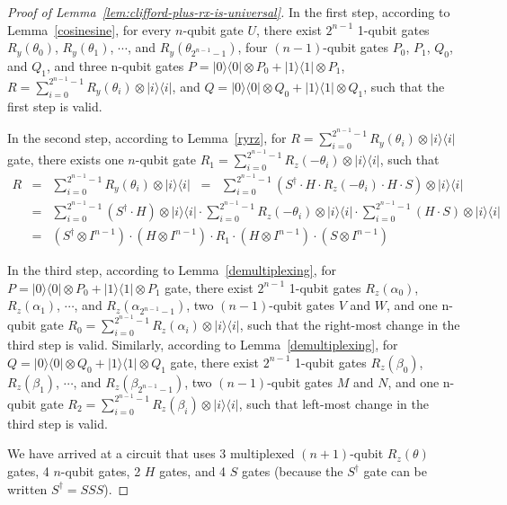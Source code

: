 \documentclass[11pt]{article}
\def\ket#1{|#1\rangle}
\def\bra#1{\langle#1|}
\def\outer#1#2{\ket{#1}\bra{#2}}
\begin{document}
\begin{proof}[Proof of Lemma~\ref{lem:clifford-plus-rx-is-universal}]
In the first step, according to Lemma~\ref{cosinesine}, for every $n$-qubit gate $U$, there exist $2^{n-1}$ 1-qubit gates $R_y(\theta_0)$, $R_y(\theta_1)$, $\cdots$, and $R_y(\theta_{2^{n-1}-1})$, four $(n-1)$-qubit gates $P_0$, $P_1$, $Q_0$, and $Q_1$, and three n-qubit gates $P = \outer{0}{0} \otimes P_{0} + \outer{1}{1} \otimes P_{1}$, $R = \sum^{2^{n-1}-1}_{i=0}R_y(\theta_i) \otimes \outer{i}{i}$, and $Q= \outer{0}{0} \otimes Q_{0} + \outer{1}{1} \otimes Q_{1}$, 
such that the first step is valid. 

In the second step, according to Lemma~\ref{ryrz}, for $R = \sum^{2^{n-1}-1}_{i=0}R_y(\theta_i) \otimes \outer{i}{i}$ gate, there exists one $n$-qubit gate $R_1 = \sum^{2^{n-1}-1}_{i=0}R_z(-\theta_i) \otimes \outer{i}{i}$, such that 
\begin{eqnarray*}
R & = & \sum^{2^{n-1}-1}_{i=0}R_y(\theta_i) \otimes \outer{i}{i} 
\;\;=\;\;
\sum^{2^{n-1}-1}_{i=0} ( S^\dag \cdot H \cdot R_z(-\theta_i) \cdot H \cdot S )\otimes \outer{i}{i} \\
& = & \sum^{2^{n-1}-1}_{i=0} ( S^\dag \cdot H )\otimes \outer{i}{i} \cdot  \sum^{2^{n-1}-1}_{i=0}   R_z(-\theta_i) \otimes \outer{i}{i}  \cdot \sum^{2^{n-1}-1}_{i=0} ( H \cdot S )\otimes \outer{i}{i} \\
& = & (S^\dag \otimes I^{n-1}) \cdot (H \otimes I^{n-1}) \cdot R_1 \cdot (H \otimes I^{n-1}) \cdot (S \otimes I^{n-1})
\end{eqnarray*}

In the third step, according to Lemma~\ref{demultiplexing}, for $P = \outer{0}{0} \otimes P_{0} + \outer{1}{1} \otimes P_{1} $ gate, there exist $2^{n-1}$ 1-qubit gates $R_z(\alpha_0)$, $R_z(\alpha_1)$, $\cdots$, and $R_z(\alpha_{2^{n-1}-1})$, two $(n-1)$-qubit gates $V$ and $W$, and one n-qubit gate $R_0 = \sum^{2^{n-1}-1}_{i=0}R_{z}(\alpha_i) \otimes \outer{i}{i}$, such that the right-most 
change in the third step is valid. 
Similarly, according to Lemma~\ref{demultiplexing}, for $Q = \outer{0}{0} \otimes Q_{0} + \outer{1}{1} \otimes Q_{1} $ gate, there exist $2^{n-1}$ 1-qubit gates $R_z(\beta_0)$, $R_z(\beta_1)$, $\cdots$, and $R_z(\beta_{2^{n-1}-1})$, two $(n-1)$-qubit gates $M$ and $N$, and one n-qubit gate $R_2 = \sum^{2^{n-1}-1}_{i=0}R_{z}(\beta_i) \otimes \outer{i}{i}$, such that left-most change in the third step is valid.

We have arrived at a circuit that uses 
3 multiplexed $(n+1)$-qubit $R_z(\theta)$ gates,
4 $n$-qubit gates,
2 $H$ gates, and
4 $S$ gates
(because the $S^\dag$ gate can be written $S^\dag = SSS$).


\end{proof}
\end{document}
